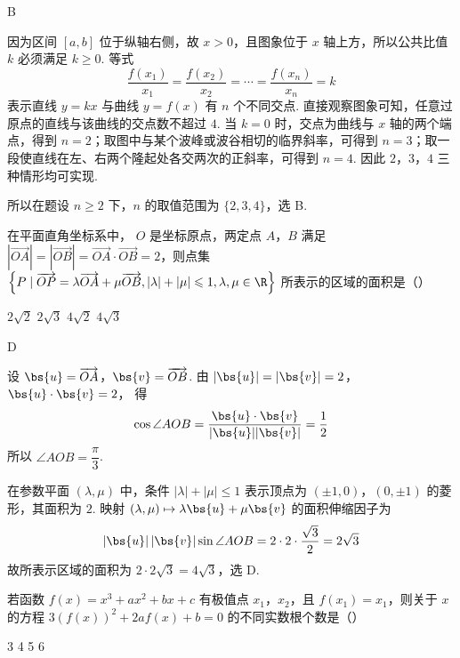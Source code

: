 \begin{answer}
B
\end{answer}

\begin{solution}
因为区间 \([a,b]\) 位于纵轴右侧，故 \(x>0\)，且图象位于 \(x\) 轴上方，所以公共比值 \(k\) 必须满足 \(k\geqslant0\). 等式
\[
\frac{f(x_1)}{x_1}=\frac{f(x_2)}{x_2}=\cdots=\frac{f(x_n)}{x_n}=k
\]
表示直线 \(y=kx\) 与曲线 \(y=f(x)\) 有 \(n\) 个不同交点. 直接观察图象可知，任意过原点的直线与该曲线的交点数不超过 \(4\). 当 \(k=0\) 时，交点为曲线与 \(x\) 轴的两个端点，得到 \(n=2\)；取图中与某个波峰或波谷相切的临界斜率，可得到 \(n=3\)；取一段使直线在左、右两个隆起处各交两次的正斜率，可得到 \(n=4\). 因此 \(2\)，\(3\)，\(4\) 三种情形均可实现.

所以在题设 \(n\geqslant2\) 下，\(n\) 的取值范围为 \(\{2,3,4\}\)，选 B.
\end{solution}

\begin{problem}
在平面直角坐标系中， \(O\) 是坐标原点，两定点 \(A\)，\(B\) 满足 \(\left|\overrightarrow{OA}\right| = \left|\overrightarrow{OB}\right| = \overrightarrow{OA} \cdot \overrightarrow{OB} = 2\)，则点集 \(\left\{P \mid \overrightarrow{OP} = \lambda \overrightarrow{OA} + \mu \overrightarrow{OB}, |\lambda| + |\mu| \leqslant 1, \lambda, \mu \in \R\right\}\) 所表示的区域的面积是（\quad）

\choices
    {\(2\sqrt{2}\)}
    {\(2\sqrt{3}\)}
    {\(4\sqrt{2}\)}
    {\(4\sqrt{3}\)}
\end{problem}

\begin{answer}
D
\end{answer}

\begin{solution}
设 \(\bs{u}=\overrightarrow{OA}\)，\(\bs{v}=\overrightarrow{OB}\). 由
\(|\bs{u}|=|\bs{v}|=2\)，\(\bs{u}\cdot\bs{v}=2\)，
得
\[
\cos\angle AOB=\frac{\bs{u}\cdot\bs{v}}{|\bs{u}||\bs{v}|}=\frac12
\]
所以 \(\angle AOB=\dfrac\pi3\).

在参数平面 \((\lambda,\mu)\) 中，条件 \(|\lambda|+|\mu|\leqslant1\) 表示顶点为 \((\pm1,0)\)，\((0,\pm1)\) 的菱形，其面积为 \(2\). 映射 \((\lambda,\mu)\mapsto\lambda\bs{u}+\mu\bs{v}\) 的面积伸缩因子为
\[
|\bs{u}|\,|\bs{v}|\sin\angle AOB=2\cdot2\cdot\frac{\sqrt3}{2}=2\sqrt3
\]
故所表示区域的面积为 \(2\cdot2\sqrt3=4\sqrt3\)，选 D.
\end{solution}

\begin{problem}
若函数 \( f(x) = x^3 + ax^2 + bx + c \) 有极值点 \(x_1\)，\(x_2\)，且 \( f(x_1) = x_1 \)，则关于 \( x \) 的方程 \( 3(f(x))^2 + 2af(x) + b = 0 \) 的不同实数根个数是（\quad）

\choices
    {3}
    {4}
    {5}
    {6}
\end{problem}

